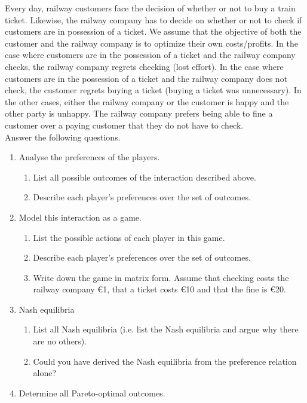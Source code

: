 \documentclass[../main.tex]{subfiles}
\begin{document}
\begin{question}

Every day, railway customers face the decision of whether or not to buy a train ticket. Likewise, the railway company has to decide on whether or not to check if customers are in possession of a ticket. We assume that the objective of both the customer and the railway company is to optimize their own costs/profits. In the case where customers are in the possession of a ticket and the railway company checks, the railway company regrets checking (lost effort). In the case where customers are in the possession of a ticket and the railway company does not check, the customer regrets buying a ticket (buying a ticket was unnecessary). In the other cases, either the railway company or the customer is happy and the other party is unhappy. The railway company prefers being able to fine a customer over a paying customer that they do not have to check.\\

Answer the following questions.
\begin{enumerate}
	\item Analyse the preferences of the players.
	\begin{enumerate}
		\item List all possible outcomes of the interaction described above.
		\item Describe each player’s preferences over the set of outcomes.
	\end{enumerate}
	\item Model this interaction as a game.
	\begin{enumerate}
		\item List the possible actions of each player in this game.
		\item Describe each player’s preferences over the set of outcomes.
		\item Write down the game in matrix form. Assume that checking costs the railway company \euro1, that a ticket costs \euro10 and that the fine is \euro20.
	\end{enumerate}
	
	\item Nash equilibria
	\begin{enumerate}
		\item List all Nash equilibria (i.e. list the Nash equilibria and argue why there are no others). 
		\item Could you have derived the Nash equilibria from the preference relation alone?
	\end{enumerate}
	
	\item Determine all Pareto-optimal outcomes.
		
\end{enumerate}


\end{question}
\end{document}
